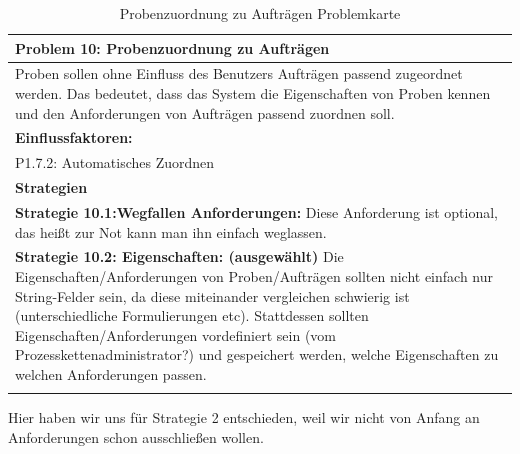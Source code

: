 \documentclass[enabledeprecatedfontcommands,fontsize=12pt,paper=a4,twoside]{scrartcl}
\begin{document}
\begin{table}[H]
    \centering
    \begin{tabular}{|p{15cm}|}
    \hline
          \textbf{Problem 10:} Probenzuordnung zu Aufträgen
          \\ \hline
          Proben sollen ohne Einfluss des Benutzers Aufträgen passend zugeordnet werden. Das bedeutet, dass das System die Eigenschaften von Proben kennen und den Anforderungen von Aufträgen passend zuordnen soll.
          \\ \hline
          \textbf{Einflussfaktoren: } \\
          P1.7.2: Automatisches Zuordnen \\
          \hline
          \textbf{Strategien} \\ \hline
          \textbf{Strategie 10.1:Wegfallen Anforderungen:} Diese Anforderung ist optional, das heißt zur Not kann man ihn einfach weglassen. \\
	  \textbf{Strategie 10.2: Eigenschaften: (ausgewählt)} Die Eigenschaften/Anforderungen von Proben/Aufträgen sollten nicht einfach nur String-Felder sein, da diese miteinander vergleichen schwierig ist (unterschiedliche Formulierungen etc). Stattdessen sollten Eigenschaften/Anforderungen vordefiniert sein (vom Prozesskettenadministrator?) und gespeichert werden, welche Eigenschaften zu welchen Anforderungen passen. \\
          \\ \hline
    \end{tabular}
    \caption{Probenzuordnung zu Aufträgen Problemkarte}
    \label{tab:ProblemKarte10}
\end{table}
Hier haben wir uns für Strategie 2 entschieden, weil wir nicht von Anfang an Anforderungen schon ausschließen wollen. \\
\end{document}
